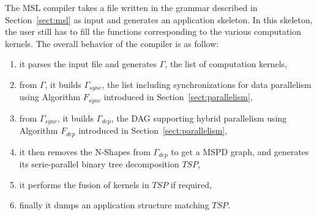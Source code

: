 

The MSL compiler takes a file written in the grammar described in Section~\ref{sect:msl} as input and generates an application skeleton.
In this skeleton, the user still has to fill the functions corresponding to the various computation kernels.
The overall behavior of the compiler is as follow: %
\begin{enumerate}
 \item it parses the input file and generates $\Gamma$, the list of computation kernels,
 \item from $\Gamma$, it builds $\Gamma_{sync}$, the list including synchronizations for data parallelism using Algorithm $F_{sync}$ introduced in Section~\ref{sect:parallelism},
 \item from $\Gamma_{sync}$, it builds $\Gamma_{dep}$, the DAG supporting hybrid parallelism using Algorithm $F_{dep}$ introduced in Section~\ref{sect:parallelism},
 \item it then removes the N-Shapes from $\Gamma_{dep}$ to get a MSPD graph, and generates its serie-parallel binary tree decomposition $TSP$,
 \item it performs the fusion of kernels in $TSP$ if required,
 \item finally it dumps an application structure matching $TSP$.
\end{enumerate}

